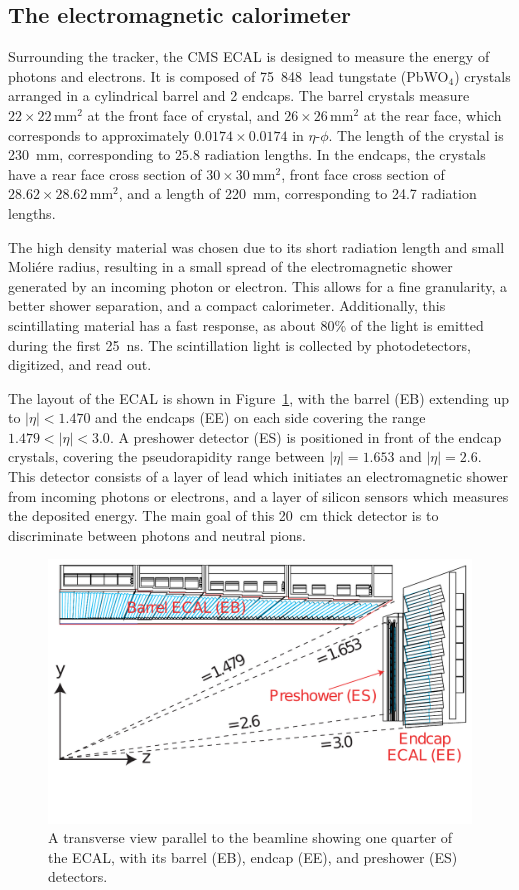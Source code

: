 \subsection{The electromagnetic calorimeter}

Surrounding the tracker, the \ac{CMS} \acf{ECAL} is designed to measure the energy of photons and electrons. It is composed of 75~848~lead tungstate (PbWO$_4$) crystals arranged in a cylindrical barrel and 2 endcaps. The barrel crystals measure $22\times22\, \mathrm{mm}^2$ at the front face of crystal, and $26\times26\, \mathrm{mm}^2$ at the rear face, which corresponds to approximately $0.0174\times0.0174$ in $\eta$-$\phi$. The length of the crystal is \SI{230}{mm}, corresponding to $25.8$ radiation lengths. In the endcaps, the crystals have a rear face cross section of $30\times30\, \mathrm{mm}^2$, front face cross section of $28.62\times28.62\, \mathrm{mm}^2$, and a length of \SI{220}{mm}, corresponding to 24.7 radiation lengths. 

The high density material was chosen due to its short radiation length and small Moli\'ere radius, resulting in a small spread of the electromagnetic shower generated by an incoming photon or electron. This allows for a fine granularity, a better shower separation, and a compact calorimeter. Additionally, this scintillating material has a fast response, as about 80\% of the light is emitted during the first \SI{25}{ns}. The scintillation light is collected by photodetectors, digitized, and read out.

The layout of the \ac{ECAL} is shown in Figure~\ref{fig:ecal}, with the barrel (EB) extending up to $|\eta| < 1.470$ and the endcaps (EE) on each side covering the range $1.479 < |\eta| < 3.0$. A preshower detector (ES) is positioned in front of the endcap crystals, covering the pseudorapidity range between $|\eta|=1.653$ and $|\eta| = 2.6$. This detector consists of a layer of lead which initiates an electromagnetic shower from incoming photons or electrons, and a layer of silicon sensors which measures the deposited energy. The main goal of this 20~cm thick detector is to discriminate between photons and neutral pions.

\begin{figure}[ht]
 \centering
 \includegraphics[width = .8\textwidth]{Transverse_section}
\caption{A transverse view parallel to the beamline showing one quarter of the \ac{ECAL}, with its barrel (EB), endcap (EE), and preshower (ES) detectors.}
\label{fig:ecal}
\end{figure}

